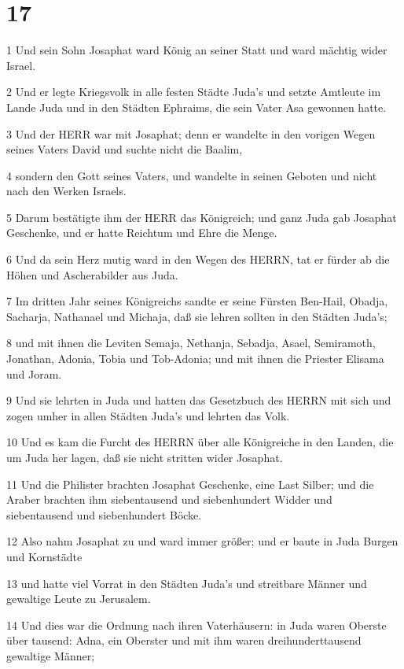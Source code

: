 \chapter{17}

\par 1 Und sein Sohn Josaphat ward König an seiner Statt und ward mächtig wider Israel.
\par 2 Und er legte Kriegsvolk in alle festen Städte Juda's und setzte Amtleute im Lande Juda und in den Städten Ephraims, die sein Vater Asa gewonnen hatte.
\par 3 Und der HERR war mit Josaphat; denn er wandelte in den vorigen Wegen seines Vaters David und suchte nicht die Baalim,
\par 4 sondern den Gott seines Vaters, und wandelte in seinen Geboten und nicht nach den Werken Israels.
\par 5 Darum bestätigte ihm der HERR das Königreich; und ganz Juda gab Josaphat Geschenke, und er hatte Reichtum und Ehre die Menge.
\par 6 Und da sein Herz mutig ward in den Wegen des HERRN, tat er fürder ab die Höhen und Ascherabilder aus Juda.
\par 7 Im dritten Jahr seines Königreichs sandte er seine Fürsten Ben-Hail, Obadja, Sacharja, Nathanael und Michaja, daß sie lehren sollten in den Städten Juda's;
\par 8 und mit ihnen die Leviten Semaja, Nethanja, Sebadja, Asael, Semiramoth, Jonathan, Adonia, Tobia und Tob-Adonia; und mit ihnen die Priester Elisama und Joram.
\par 9 Und sie lehrten in Juda und hatten das Gesetzbuch des HERRN mit sich und zogen umher in allen Städten Juda's und lehrten das Volk.
\par 10 Und es kam die Furcht des HERRN über alle Königreiche in den Landen, die um Juda her lagen, daß sie nicht stritten wider Josaphat.
\par 11 Und die Philister brachten Josaphat Geschenke, eine Last Silber; und die Araber brachten ihm siebentausend und siebenhundert Widder und siebentausend und siebenhundert Böcke.
\par 12 Also nahm Josaphat zu und ward immer größer; und er baute in Juda Burgen und Kornstädte
\par 13 und hatte viel Vorrat in den Städten Juda's und streitbare Männer und gewaltige Leute zu Jerusalem.
\par 14 Und dies war die Ordnung nach ihren Vaterhäusern: in Juda waren Oberste über tausend: Adna, ein Oberster und mit ihm waren dreihunderttausend gewaltige Männer;
